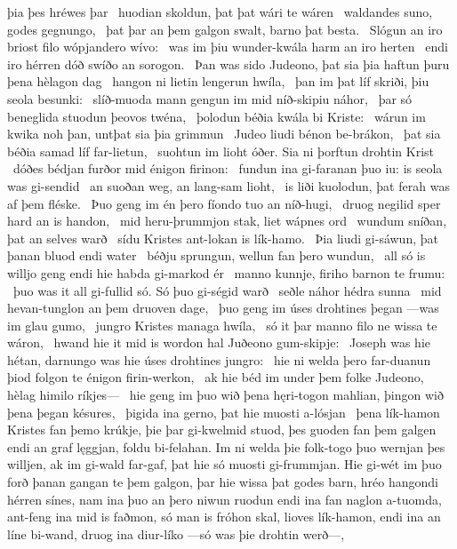 þia þes hréwes þar \hld\ huodian skoldun,
þat þat wári te wáren \hld\ waldandes suno,
godes gegnungo, \hld\ þat þar an þem galgon swalt,
barno þat besta. \hld\ Slógun an iro briost filo
wópjandero wívo: \hld\ was im þiu wunder-kwála
harm an iro herten \hld\ endi iro hérren dóð
swíðo an sorogon. \hld\ Þan was sido Judeono,
þat sia þia haftun þuru þena hèlagon dag \hld\ hangon ni lietin
lengerun hwíla, \hld\ þan im þat líf skriði,
þiu seola besunki: \hld\ slíð-muoda mann
gengun im mid níð-skipiu náhor, \hld\ þar só beneglida stuodun
þeovos twéna, \hld\ þolodun béðia
kwála bi Kriste: \hld\ wárun im kwika noh þan,
untþat sia þia grimmun \hld\ Judeo liudi
bénon be-brákon, \hld\ þat sia béðia samad
líf far-lietun, \hld\ suohtun im lioht óðer.
Sia ni þorftun drohtin Krist \hld\ dóðes bédjan
furðor mid énigon firinon: \hld\ fundun ina gi-faranan þuo iu:
is seola was gi-sendid \hld\ an suoðan weg,
an lang-sam lioht, \hld\ is liði kuolodun,
þat ferah was af þem fléske. \hld\ Þuo geng im én þero fíondo tuo
an níð-hugi, \hld\ druog negilid sper
hard an is handon, \hld\ mid heru-þrummjon stak,
liet wápnes ord \hld\ wundum sníðan,
þat an selves warð \hld\ sídu Kristes
ant-lokan is lík-hamo. \hld\ Þia liudi gi-sáwun,
þat þanan bluod endi water \hld\ béðju sprungun,
wellun fan þero wundun, \hld\ all só is willjo geng
endi hie habda gi-markod ér \hld\ manno kunnje,
firiho barnon te frumu: \hld\ þuo was it all gi-fullid só.
Só þuo gi-ségid warð \hld\ seðle náhor
hédra sunna \hld\ mid hevan-tunglon
an þem druoven dage, \hld\ þuo geng im úses drohtines þegan
—was im glau gumo, \hld\ jungro Kristes
managa hwíla, \hld\ só it þar manno filo
ne wissa te wáron, \hld\ hwand hie it mid is wordon hal
Juðeono gum-skipje: \hld\ Joseph was hie hétan,
darnungo was hie úses drohtines jungro: \hld\ hie ni welda þero far-duanun þiod
folgon te énigon firin-werkon, \hld\ ak hie béd im under þem folke Judeono,
hèlag himilo ríkjes— \hld\ hie geng im þuo wið þena hęri-togon mahlian,
þingon wið þena þegan késures, \hld\ þigida ina gerno,
þat hie muosti a-lósjan \hld\ þena lík-hamon
Kristes fan þemo krúkje, þie þar gi-kwelmid stuod,
þes guoden fan þem galgen endi an graf lęggjan,
foldu bi-felahan. Im ni welda þie folk-togo þuo
wernjan þes willjen, ak im gi-wald far-gaf,
þat hie só muosti gi-frummjan. Hie gi-wét im þuo forð þanan
gangan te þem galgon, þar hie wissa þat godes barn,
hréo hangondi hérren sínes,
nam ina þuo an þero niwun ruodun endi ina fan naglon a-tuomda,
ant-feng ina mid is faðmon, só man is fróhon skal,
lioves lík-hamon, endi ina an líne bi-wand,
druog ina diur-líko —só was þie drohtin werð—,
